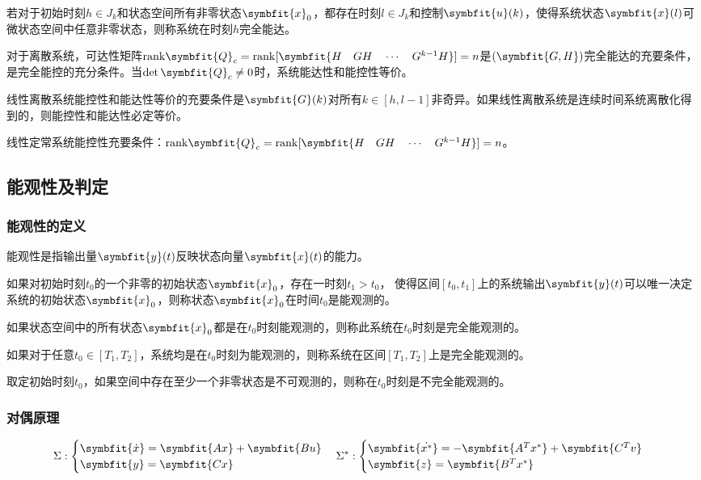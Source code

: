 \documentclass[11pt,a4paper]{ctexart}
\newcommand{\bm}{\symbfit}
\begin{document}
            若对于初始时刻$h\in J_k$和状态空间所有非零状态$\bm{x}_0$，都存在时刻$l\in J_k$和控制$\bm{u}(k)$，使得系统状态$\bm{x}(l)$可微状态空间中任意非零状态，则称系统在时刻$h$完全能达。

            对于离散系统，可达性矩阵${\rm rank}\bm{Q}_c={\rm rank}[\bm{H\quad GH\quad\cdots\quad G^{k-1}H}]=n$是$(\bm{G,H})$完全能达的充要条件，是完全能控的充分条件。当$\det \bm{Q}_c\neq0$时，系统能达性和能控性等价。

            线性离散系统能控性和能达性等价的充要条件是$\bm{G}(k)$对所有$k\in[h,l-1]$非奇异。如果线性离散系统是连续时间系统离散化得到的，则能控性和能达性必定等价。

            线性定常系统能控性充要条件：${\rm rank}\bm{Q}_c={\rm rank}[\bm{H\quad GH\quad\cdots\quad G^{k-1}H}]=n$。
    \subsection{能观性及判定}
        \subsubsection{能观性的定义}
            能观性是指输出量$\bm{y}(t)$反映状态向量$\bm{x}(t)$的能力。

            如果对初始时刻$t_0$的一个非零的初始状态$\bm{x}_0$，存在一时刻$t_1>t_0$，
            使得区间$[t_0,t_1]$上的系统输出$\bm{y}(t)$可以唯一决定系统的初始状态$\bm{x}_0$，则称状态$\bm{x}_0$在时间$t_0$是能观测的。

            如果状态空间中的所有状态$\bm{x}_0$都是在$t_0$时刻能观测的，则称此系统在$t_0$时刻是完全能观测的。
            
            如果对于任意$t_0\in[T_1,T_2]$，系统均是在$t_0$时刻为能观测的，则称系统在区间$[T_1,T_2]$上是完全能观测的。

            取定初始时刻$t_0$，如果空间中存在至少一个非零状态是不可观测的，则称在$t_0$时刻是不完全能观测的。

        \subsubsection{对偶原理}
            \[
            \Sigma:\begin{cases}
                \bm{\dot{x}}=\bm{Ax}+\bm{Bu}\\
                \bm{y}=\bm{Cx}
            \end{cases}
            \Sigma^*:\begin{cases}
                \bm{\dot{x^*}}=-\bm{A^Tx^*}+\bm{C^Tv}\\
                \bm{z}=\bm{B^Tx^*}
            \end{cases}
            \]
        
\end{document}
